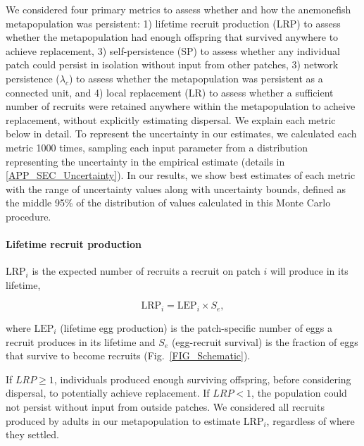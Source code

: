 \documentclass[12pt, oneside]{article}   	%
\begin{document}
We considered four primary metrics to assess whether and how the anemonefish metapopulation was persistent: 1) lifetime recruit production (LRP) to assess whether the metapopulation had enough offspring that survived anywhere to achieve replacement, 3) self-persistence (SP) to assess whether any individual patch could persist in isolation without input from other patches, 3) network persistence ($\lambda_c$) to assess whether the metapopulation was persistent as a connected unit, and 4) local replacement (LR) to assess whether a sufficient number of recruits were retained anywhere within the metapopulation to acheive replacement, without explicitly estimating dispersal. We explain each metric below in detail. To represent the uncertainty in our estimates, we calculated each metric 1000 times, sampling each input parameter from a distribution representing the uncertainty in the empirical estimate (details in \ref{APP_SEC_Uncertainty}). In our results, we show best estimates of each metric with the range of uncertainty values along with uncertainty bounds, defined as the middle 95\% of the distribution of values calculated in this Monte Carlo procedure. %

\paragraph*{Lifetime recruit production}
$\text{LRP}_i$ is the expected number of recruits a recruit on patch $i$ will produce in its lifetime,

\begin{equation}
\text{LRP}_i = \text{LEP}_i \times S_e, \label{EQN_LRP}
\end{equation}

where $\text{LEP}_i$ (lifetime egg production) is the patch-specific number of eggs a recruit produces in its lifetime and $S_e$ (egg-recruit survival) is the fraction of eggs that survive to become recruits (Fig.\ \ref{FIG_Schematic}).

If $LRP \geq 1$, individuals produced enough surviving offspring, before considering dispersal, to potentially achieve replacement. If $LRP < 1$, the population could not persist without input from outside patches. We considered all recruits produced by adults in our metapopulation to estimate $\text{LRP}_i$, regardless of where they settled. %
\end{document}
